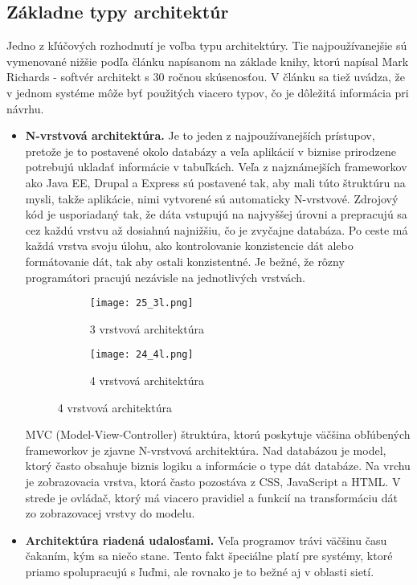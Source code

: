 \subsection{Základne typy architektúr}
Jedno z kľúčových rozhodnutí je voľba typu architektúry. Tie najpoužívanejšie sú vymenované nižšie podľa článku \cite{IOT05} napísanom na základe knihy\cite{IOT08}, ktorú napísal Mark Richards - softvér architekt s 30 ročnou skúsenosťou. V článku sa tiež uvádza, že v jednom systéme môže byť použitých viacero typov, čo je  dôležitá informácia pri návrhu.
\begin{itemize}
 \item \textbf{ N-vrstvová architektúra.} Je to jeden z najpoužívanejších prístupov, pretože je to postavené okolo databázy a veľa aplikácií v biznise prirodzene potrebujú ukladať informácie v tabuľkách. \indent Veľa z najznámejších frameworkov ako Java EE, Drupal a Express sú postavené tak, aby mali túto štruktúru na mysli, takže aplikácie, nimi vytvorené sú automaticky N-vrstvové.
\indent Zdrojový kód je usporiadaný tak, že dáta vstupujú na najvyššej úrovni a prepracujú sa cez každú vrstvu až dosiahnú najnižšiu, čo je zvyčajne databáza. Po ceste má každá vrstva svoju úlohu, ako kontrolovanie konzistencie dát alebo formátovanie dát, tak aby ostali konzistentné. Je bežné, že rôzny programátori pracujú nezávisle na jednotlivých vrstvách.
\begin{figure}[h]
\centering
\begin{subfigure}{0.5\linewidth}
\texttt{[image: 25\_3l.png]}
\caption{3 vrstvová architektúra \cite{IOT07}}
\label{25_3l}
\end{subfigure}%
\begin{subfigure}{0.5\linewidth}
\texttt{[image: 24\_4l.png]}
\caption{4 vrstvová architektúra\cite{IOT06}}
\label{24_4l}
\end{subfigure}
\end{figure}
MVC (Model-View-Controller) štruktúra, ktorú poskytuje väčšina obľúbených frameworkov je zjavne N-vrstvová architektúra. Nad databázou je model, ktorý často obsahuje biznis logiku a informácie o type dát databáze. Na vrchu je zobrazovacia vrstva, ktorá často pozostáva z CSS, JavaScript a HTML. V strede je ovládač, ktorý má viacero pravidiel a funkcií na transformáciu dát zo zobrazovacej vrstvy do modelu.
 \item \textbf{ Architektúra riadená udalosťami.} Veľa programov trávi väčšinu času čakaním, kým sa niečo stane. Tento fakt špeciálne platí pre systémy, ktoré priamo spolupracujú  s ľuďmi, ale rovnako je to bežné aj v oblasti sietí.

\end{itemize}
